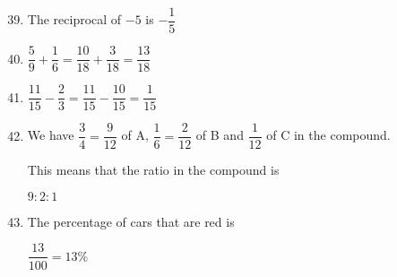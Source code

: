 \documentclass[fleqn]{article}
\begin{document}
\begin{enumerate}[label=\textbf{\arabic*.},labelsep=2em]
\setcounter{enumi}{38}
\item
The reciprocal of $ -5 $ is $ -\dfrac{1}{5} $

\setcounter{enumi}{40}
\item
$ \dfrac{5}{9} + \dfrac{1}{6} = \dfrac{10}{18} + \dfrac{3}{18} = \dfrac{13}{18} $

\setcounter{enumi}{42}
\item
$ \dfrac{11}{15} - \dfrac{2}{3} = \dfrac{11}{15} - \dfrac{10}{15} = \dfrac{1}{15} $

\setcounter{enumi}{46}
\item
We have $ \dfrac{3}{4} = \dfrac{9}{12} $ of A, $ \dfrac{1}{6} = \dfrac{2}{12} $ of B and $ \dfrac{1}{12} $ of C in the compound.

This means that the ratio in the compound is 

$ 9:2:1 $

\setcounter{enumi}{48}
\item
The percentage of cars that are red is

$ \dfrac{13}{100}=13\%$


\end{enumerate}
\end{document}
